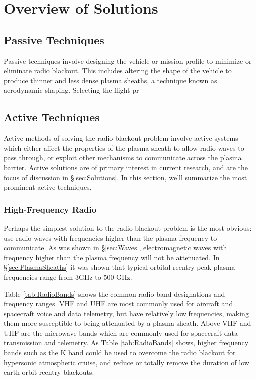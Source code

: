 \documentclass[twocolumn]{article}
\begin{document}
\section{Overview of Solutions} \label{sec:Overview}
	\subsection*{Passive Techniques}
		Passive techniques involve designing the vehicle or mission profile to minimize or eliminate radio blackout.
		This includes altering the shape of the vehicle to produce thinner and less dense plasma sheaths, a technique known as aerodynamic shaping.
		Selecting the flight pr
		
	\subsection*{Active Techniques}
		Active methods of solving the radio blackout problem involve active systems which either affect the properties of the plasma sheath to allow radio waves to pass through, or exploit other mechanisms to communicate across the plasma barrier.
		Active solutions are of primary interest in current research, and are the focus of discussion in \S\ref{sec:Solutions}.
		In this section, we'll summarize the most prominent active techniques.
	
		\subsubsection*{High-Frequency Radio}
			Perhaps the simplest solution to the radio blackout problem is the most obvious: use radio waves with frequencies higher than the plasma frequency to communicate.
			As was shown in \S\ref{sec:Waves}, electromagnetic waves with frequency higher than the plasma frequency will not be attenuated.
			In \S\ref{sec:PlasmaSheaths} it was shown that typical orbital reentry peak plasma frequencies range from 3GHz to 500 GHz.
			
			Table \ref{tab:RadioBands} shows the common radio band designations and frequency ranges.
			VHF and UHF are most commonly used for aircraft and spacecraft voice and data telemetry, but have relatively low frequencies, making them more susceptible to being attenuated by a plasma sheath.
			Above VHF and UHF are the microwave bands which are commonly used for spacecraft data transmission and telemetry.
			As Table \ref{tab:RadioBands} shows, higher frequency bands such as the K band could be used to overcome the radio blackout for hypersonic atmospheric cruise, and reduce or totally remove the duration of low earth orbit reentry blackouts.
			
\end{document}

